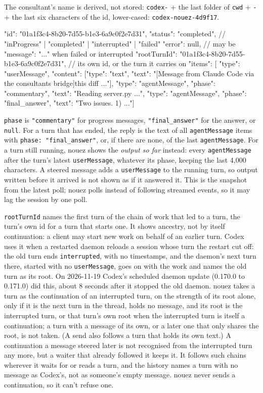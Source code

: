 \documentclass[10pt,a4paper]{article}
\newcommand{\code}[1]{\texttt{#1}}
\begin{document}
The consultant's name is derived, not stored: \code{codex-} + the last folder of \code{cwd} +
\code{-} + the last six characters of the id, lower-cased: \code{codex-nouez-4d9f17}.

\begin{wire}
{"id": "01a1f3c4-8b20-7d55-b1e3-6a9c0f2e7d31",
 "status": "completed",                  // "inProgress" | "completed" | "interrupted" | "failed"
 "error": null,                          // may be {"message": "..."} when failed or interrupted
 "rootTurnId": "01a1f3c4-8b20-7d55-b1e3-6a9c0f2e7d31",  // its own id, or the turn it carries on
 "items": [
   {"type": "userMessage", "content": [{"type": "text",
     "text": "[Message from Claude Code via the consultants bridge]\n\nReview this diff ..."}]},
   {"type": "agentMessage", "phase": "commentary", "text": "Reading server.py ..."},
   {"type": "agentMessage", "phase": "final_answer", "text": "Two issues. 1) ..."}]}
\end{wire}

\code{phase} is \code{"commentary"} for progress messages, \code{"final\_answer"} for the answer,
or \code{null}. For a turn that has ended, the reply is the text of all \code{agentMessage} items
with \code{phase: "final\_answer"}, or, if there are none, of the last \code{agentMessage}. For a
turn still running, nouez shows the \emph{output so far} instead: every \code{agentMessage}
after the turn's latest \code{userMessage}, whatever its phase, keeping the last 4,000
characters. A steered message adds a \code{userMessage} to the running turn, so output written
before it arrived is not shown as if it answered it. This is the snapshot from the latest poll;
nouez polls instead of following streamed events, so it may lag the session by one poll.

\code{rootTurnId} names the first turn of the chain of work that led to a turn, the turn's own id
for a turn that starts one. It shows ancestry, not by itself continuation: a client may start new
work on behalf of an earlier turn. Codex uses it when a restarted daemon reloads a session whose
turn the restart cut off: the old turn ends \code{interrupted}, with no timestamps, and the
daemon's next turn there, started with no \code{userMessage}, goes on with the work and names the
old turn as its root. On 2026-11-19 Codex's scheduled daemon update (0.170.0 to 0.171.0) did this,
about 8 seconds after it stopped the old daemon. nouez takes a turn as the continuation of an
interrupted turn, on the strength of its root alone, only if it is the next turn in the thread,
holds no message, and its root is the interrupted turn, or that turn's own root when the
interrupted turn is itself a continuation; a turn with a message of its own, or a later one that
only shares the root, is not taken. (A send also follows a turn that holds its own text.) A
continuation a message steered later is not recognised from the interrupted turn any more, but a
waiter that already followed it keeps it. It follows such chains wherever it waits for or reads a turn, and
the history names a turn with no message as Codex's, not as someone's empty message. nouez never
sends a continuation, so it can't refuse one.
\end{document}
